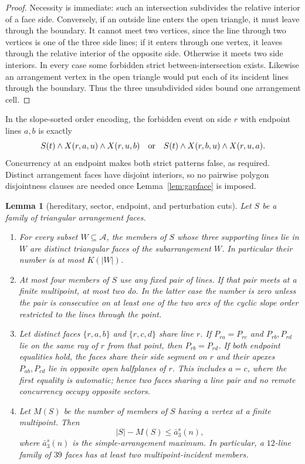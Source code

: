 \documentclass[11pt]{article}
\newtheorem{lemma}[theorem]{Lemma}
\theoremstyle{definition}
\begin{document}
\begin{proof}
Necessity is immediate: such an intersection subdivides the relative interior
of a face side. Conversely, if an outside line enters the open triangle, it
must leave through the boundary. It cannot meet two vertices, since the line
through two vertices is one of the three side lines; if it enters through one
vertex, it leaves through the relative interior of the opposite side.
Otherwise it meets two side interiors. In every case some forbidden strict
between-intersection exists. Likewise an arrangement vertex in the open
triangle would put each of its incident lines through the boundary. Thus the
three unsubdivided sides bound one arrangement cell.
\end{proof}

In the slope-sorted order encoding, the forbidden event on side $r$ with
endpoint lines $a,b$ is exactly
\[
 S(t)\wedge X(r,a,u)\wedge X(r,u,b)
 \quad\hbox{or}\quad
 S(t)\wedge X(r,b,u)\wedge X(r,u,a).
\]
Concurrency at an endpoint makes both strict patterns false, as required.
Distinct arrangement faces have disjoint interiors, so no pairwise polygon
disjointness clauses are needed once Lemma~\ref{lem:gapface} is imposed.

\begin{lemma}[hereditary, sector, endpoint, and perturbation cuts]
\label{lem:hereditary}
Let $S$ be a family of triangular arrangement faces.
\begin{enumerate}
\item For every subset $W\subseteq\mathcal A$, the members of $S$ whose three
supporting lines lie in $W$ are distinct triangular faces of the
subarrangement $W$. In particular their number is at most $K(|W|)$.
\item At most four members of $S$ use any fixed pair of lines. If that pair
meets at a finite multipoint, at most two do. In the latter case the number is
zero unless the pair is consecutive on at least one of the two arcs of the
cyclic slope order restricted to the lines through the point.
\item Let distinct faces $\{r,a,b\}$ and $\{r,c,d\}$ share line $r$. If
$P_{ra}=P_{rc}$ and $P_{rb},P_{rd}$ lie on the same ray of $r$ from that
point, then $P_{rb}=P_{rd}$. If both endpoint equalities hold, the faces share
their side segment on $r$ and their apexes $P_{ab},P_{cd}$ lie in opposite
open halfplanes of $r$. This includes $a=c$, where the first equality is
automatic; hence two faces sharing a line pair and no remote concurrency
occupy opposite sectors.
\item Let $M(S)$ be the number of members of $S$ having a vertex at a finite
multipoint. Then
\[
 |S|-M(S)\le \bar a_3^s(n),
\]
where $\bar a_3^s(n)$ is the simple-arrangement maximum. In particular, a
$12$-line family of $39$ faces has at least two multipoint-incident members.
\end{enumerate}
\end{lemma}
\end{document}
